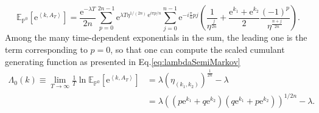 \documentclass[a4paper,11pt]{article}
\numberwithin{equation}{section}
\begin{document}
\begin{equation}
    \mathbb{E}_{\mathbb{P}^0} \left[ \mathrm{e}^{\left\langle k, A_T \right\rangle} \right] = \frac{\mathrm{e}^{-\lambda T}}{2n} \sum_{p=0}^{2n -1} \mathrm{e}^{\lambda T \eta^{1/(2n)} \, \mathrm{e}^{i\pi p/n}} \sum_{j=0}^{n-1} \mathrm{e}^{-i\frac{\pi}{n}p j}  \left( \frac{1}{\eta^{\frac{j}{2n}}} + \frac{\mathrm{e}^{k_1}+\mathrm{e}^{k_2}}{2} \frac{(-1)^p}{\eta^{\frac{n+j}{2n}}}\right).
\end{equation}
Among the many time-dependent exponentials in the sum, the leading one is the term corresponding to $p=0$, so that one can compute the scaled cumulant generating function as presented in Eq.\eqref{eq:lambdaSemiMarkov}
\begin{align*}
    \Lambda_0(k) \equiv \lim_{T \to \infty} \frac{1}{T}\ln \mathbb{E}_{\mathbb{P}^0} \left[ \mathrm{e}^{\left\langle k, A_T \right\rangle} \right] &= \lambda (\eta_{(k_1,k_2)})^{\frac{1}{2n}} - \lambda \\
    &= \lambda \left( (p \mathrm{e}^{k_1} + q \mathrm{e}^{k_2})(q \mathrm{e}^{k_1} + p \mathrm{e}^{k_2}) \right)^{1/2n} - \lambda .
\end{align*}
\end{document}
